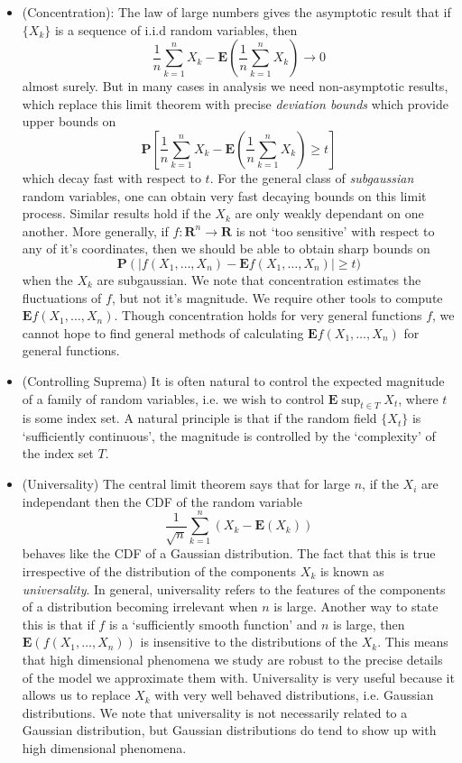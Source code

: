 \begin{itemize}
    \item (Concentration): The law of large numbers gives the asymptotic result that if $\{ X_k \}$ is a sequence of i.i.d random variables, then
    \[ \frac{1}{n} \sum_{k = 1}^n X_k - \mathbf{E} \left( \frac{1}{n} \sum_{k = 1}^n X_k \right) \to 0 \]
    almost surely. But in many cases in analysis we need non-asymptotic results, which replace this limit theorem with precise {\it deviation bounds} which provide upper bounds on
    \[ \mathbf{P} \left[ \frac{1}{n} \sum_{k = 1}^n X_k - \mathbf{E} \left( \frac{1}{n} \sum_{k = 1}^n X_k \right) \geq t \right] \]
    which decay fast with respect to $t$. For the general class of {\it subgaussian} random variables, one can obtain very fast decaying bounds on this limit process. Similar results hold if the $X_k$ are only weakly dependant on one another. More generally, if $f: \mathbf{R}^n \to \mathbf{R}$ is not `too sensitive' with respect to any of it's coordinates, then we should be able to obtain sharp bounds on
    \[ \mathbf{P} \left(|f(X_1, \dots, X_n) - \mathbf{E} f(X_1, \dots, X_n) \right| \geq t) \]
    when the $X_k$ are subgaussian. We note that concentration estimates the fluctuations of $f$, but not it's magnitude. We require other tools to compute $\mathbf{E} f(X_1, \dots, X_n)$. Though concentration holds for very general functions $f$, we cannot hope to find general methods of calculating $\mathbf{E} f(X_1, \dots, X_n)$ for general functions.

    \item (Controlling Suprema) It is often natural to control the expected magnitude of a family of random variables, i.e. we wish to control $\mathbf{E} \sup_{t \in T} X_t$, where $t$ is some index set.  A natural principle is that if the random field $\{ X_t \}$ is `sufficiently continuous', the magnitude is controlled by the `complexity' of the index set $T$.

    \item (Universality) The central limit theorem says that for large $n$, if the $X_i$ are independant then the CDF of the random variable
    \[ \frac{1}{\sqrt{n}} \sum_{k = 1}^n (X_k - \mathbf{E}(X_k)) \]
    behaves like the CDF of a Gaussian distribution. The fact that this is true irrespective of the distribution of the components $X_k$ is known as {\it universality}. In general, universality refers to the features of the components of a distribution becoming irrelevant when $n$ is large. Another way to state this is that if $f$ is a `sufficiently smooth function' and $n$ is large, then $\mathbf{E}(f(X_1, \dots, X_n))$ is insensitive to the distributions of the $X_k$. This means that high dimensional phenomena we study are robust to the precise details of the model we approximate them with. Universality is very useful because it allows us to replace $X_k$ with very well behaved distributions, i.e. Gaussian distributions. We note that universality is not necessarily related to a Gaussian distribution, but Gaussian distributions do tend to show up with high dimensional phenomena.


\end{itemize}
